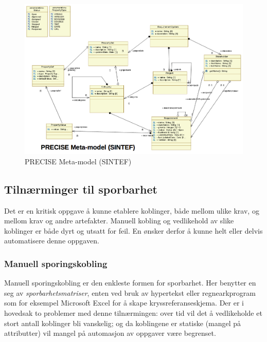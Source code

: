 \begin{figure}[htbp]
\centering
\includegraphics{Forelesning 03/img/4.png}
\caption{PRECISE Meta-model (SINTEF)}
\end{figure}

\subsection{Tilnærminger til sporbarhet}

Det er en kritisk oppgave å kunne etablere koblinger, både mellom ulike
krav, og mellom krav og andre artefakter. Manuell kobling og vedlikehold
av slike koblinger er både dyrt og utsatt for feil. En ønsker derfor å
kunne helt eller delvis automatisere denne oppgaven.

\subsubsection{Manuell sporingskobling}

Manuell sporingskobling er den enkleste formen for sporbarhet. Her
benytter en seg av \emph{sporbarhetsmatriser}, enten ved bruk av
hypertekst eller regnearkprogram som for eksempel Microsoft Excel for å
skape kryssreferanseskjema. Der er i hovedsak to problemer med denne
tilnærmingen: over tid vil det å vedlikeholde et stort antall koblinger
bli vanskelig; og da koblingene er statiske (mangel på attributter) vil
mangel på automasjon av oppgaver være begrenset.

